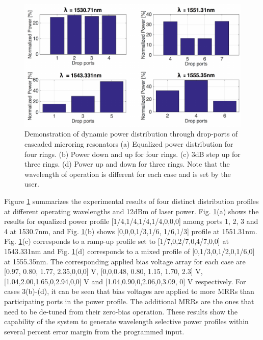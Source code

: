 \begin{figure}[t!]
\begin{center}
\includegraphics[width=13cm]{Chapter3/CH_3_power_dis.pdf}
\caption{Demonstration of dynamic power distribution through drop-ports of cascaded microring resonators (a) Equalized power distribution for four rings. (b) Power down and up for four rings. (c) 3dB step up for three rings. (d) Power up and down for three rings. Note that the wavelength of operation is different for each case and is set by the user.}
\label{fig8}
\end{center}
\vspace{-0.9cm}
\end{figure}

Figure \ref{fig8} summarizes the experimental results of four distinct distribution profiles at different operating wavelengths and 12dBm of laser power. Fig. \ref{fig8}(a) shows the results for equalized power profile [1/4,1/4,1/4,1/4,0,0,0] among ports 1, 2, 3 and 4 at 1530.7nm, and Fig. \ref{fig8}(b) shows [0,0,0,1/3,1/6,  1/6,1/3] profile at 1551.31nm. Fig. \ref{fig8}(c) corresponds to a ramp-up profile set to [1/7,0,2/7,0,4/7,0,0] at 1543.331nm and Fig. \ref{fig8}(d) corresponds to a mixed profile of [0,1/3,0,1/2,0,1/6,0] at 1555.35nm. The corresponding applied bias voltage array for each case are [0.97, 0.80, 1.77, 2.35,0,0,0] V, [0,0,0.48, 0.80, 1.15, 1.70, 2.3] V, [1.04,2.00,1.65,0,2.94,0,0] V and [1.04,0.90,0,2.06,0,3.09, 0] V respectively. For cases 3(b)-(d), it can be seen that bias voltages are applied to more MRRs than participating ports in the power profile. The additional MRRs are the ones that need to be de-tuned from their zero-bias operation. These results show the capability of the system to generate wavelength selective power profiles within several percent error margin from the programmed input. 









